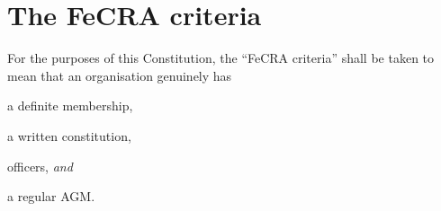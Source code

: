 \documentclass[12pt]{article}
\newcommand{\ITand}[0]{\textit{and}}
\begin{document}
\newpage


\section{The FeCRA criteria}
\label{fecracrit}

For the purposes of this Constitution, the ``FeCRA criteria'' shall be taken
to mean that an organisation genuinely has

\begin{constenum}

\item a definite membership,

\item a written constitution,

\item officers, \ITand

\item a regular AGM.

\end{constenum}
\end{document}

